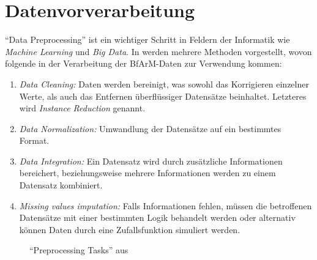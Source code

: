 \section{Datenvorverarbeitung}

"`Data Preprocessing"' ist ein wichtiger Schritt in Feldern der Informatik wie \emph{Machine Learning} und \emph{Big Data}. In \citep{garcia2016big} werden mehrere Methoden vorgestellt, wovon folgende in der Verarbeitung der BfArM-Daten zur Verwendung kommen:

\begin{enumerate}
\item \emph{Data Cleaning:} Daten werden bereinigt, was sowohl das Korrigieren einzelner Werte, als auch das Entfernen überflüssiger Datensätze beinhaltet. Letzteres wird \emph{Instance Reduction} genannt. 
\item \emph{Data Normalization:} Umwandlung der Datensätze auf ein bestimmtes Format. 
\item \emph{Data Integration:} Ein Datensatz wird durch zusätzliche Informationen bereichert, beziehungsweise mehrere Informationen werden zu einem Datensatz kombiniert. 
\item \emph{Missing values imputation:} Falls Informationen fehlen, müssen die betroffenen Datensätze mit einer bestimmten Logik behandelt werden oder alternativ können Daten durch eine Zufallsfunktion simuliert werden. 
\end{enumerate}

\begin{figure}[H]
    \centering
    \setlength{\fboxsep}{.02\linewidth}\color{black!20}
    \normalcolor\caption{"`Preprocessing Tasks"' aus \citep[Seite 4]{garcia2016big}}
\end{figure}


